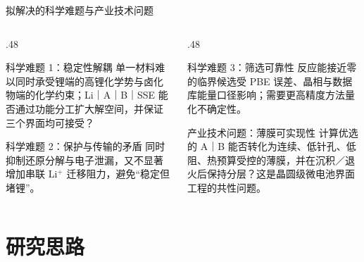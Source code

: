 \documentclass[aspectratio=169,10pt]{beamer}
\begin{document}
\begin{frame}[t]{拟解决的科学难题与产业技术问题}
\begin{columns}[T,onlytextwidth]
  \begin{column}{.48\textwidth}
    \begin{njuquote}{科学难题 1：稳定性解耦}
      单一材料难以同时承受锂端的高锂化学势与卤化物端的化学约束；Li｜A｜B｜SSE 能否通过功能分工扩大解空间，并保证三个界面均可接受？
    \end{njuquote}
    \begin{njuquote}{科学难题 2：保护与传输的矛盾}
      同时抑制还原分解与电子泄漏，又不显著增加串联 Li$^+$ 迁移阻力，避免“稳定但堵锂”。
    \end{njuquote}
  \end{column}
  \begin{column}{.48\textwidth}
    \begin{njuquoteblue}{科学难题 3：筛选可靠性}
      反应能接近零的临界候选受 PBE 误差、晶相与数据库能量口径影响；需要更高精度方法量化不确定性。
    \end{njuquoteblue}
    \begin{njuquotegold}{产业技术问题：薄膜可实现性}
      计算优选的 A｜B 能否转化为连续、低针孔、低阻、热预算受控的薄膜，并在沉积／退火后保持分层？这是晶圆级微电池界面工程的共性问题。
    \end{njuquotegold}
  \end{column}
\end{columns}
\end{frame}

\section{研究思路}
\end{document}
